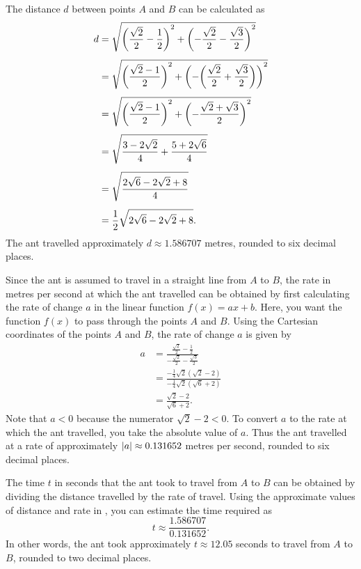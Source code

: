 \documentclass[a4paper,oneside,12pt]{article}
\begin{document}
\begin{problem}
{\begin{solution}
The distance $d$ between points $A$ and $B$ can be calculated as
\begin{align*}
d
&=
\sqrt{
  \parenthesis*{
    \frac{\sqrt{2}}{2} - \frac{1}{2}
  }^2
  +
  \parenthesis*{
    -\frac{\sqrt{2}}{2} - \frac{\sqrt{3}}{2}
  }^2
} \\[4pt]
&=
\sqrt{
  \parenthesis*{
    \frac{\sqrt{2} - 1}{2}
  }^2
  +
  \parenthesis*{
    -
    \parenthesis*{
      \frac{\sqrt{2}}{2} + \frac{\sqrt{3}}{2}
    }
  }^2
} \\[4pt]
&=
\sqrt{
  \parenthesis*{
    \frac{\sqrt{2} - 1}{2}
  }^2
  +
  \parenthesis*{
    - \frac{\sqrt{2} + \sqrt{3}}{2}
  }^2
} \\[4pt]
&=
\sqrt{
  \frac{3 - 2\sqrt{2}}{4}
  +
  \frac{5 + 2\sqrt{6}}{4}
} \\[4pt]
&=
\sqrt{
  \frac{
    2\sqrt{6} - 2\sqrt{2} + 8
  }{
    4
  }
} \\[4pt]
&=
\frac{1}{2}
\sqrt{
  2\sqrt{6} - 2\sqrt{2} + 8
}.
\end{align*}
The ant travelled approximately $d \approx 1.586707$ metres, rounded to
six decimal places.

Since the ant is assumed to travel in a straight line from $A$ to $B$,
the rate in metres per second at which the ant travelled can be
obtained by first calculating the rate of change $a$ in the linear
function $f(x) = ax + b$.  Here, you want the function $f(x)$ to pass
through the points $A$ and $B$.  Using the Cartesian coordinates of
the points $A$ and $B$, the rate of change $a$ is given by
\begin{align*}
a
&=
\frac{
  \frac{\sqrt{2}}{2} - \frac{1}{2}
}{
  -\frac{\sqrt{2}}{2} - \frac{\sqrt{3}}{2}
} \\[4pt]
&=
\frac{
  -\frac{1}{4} \sqrt{2} (\sqrt{2} - 2)
}{
  -\frac{1}{4} \sqrt{2} (\sqrt{6} + 2)
} \\[4pt]
&=
\frac{
  \sqrt{2} - 2
}{
  \sqrt{6} + 2
}.
\end{align*}
Note that $a < 0$ because the numerator $\sqrt{2} - 2 < 0$.  To
convert $a$ to the rate at which the ant travelled, you take the
absolute value of $a$.  Thus the ant travelled at a rate of
approximately $\lvert a\rvert \approx 0.131652$ metres per second,
rounded to six decimal places.

The time $t$ in seconds that the ant took to travel from $A$ to $B$
can be obtained by dividing the distance travelled by the rate of
travel.  Using the approximate values of distance and rate
in ,
you can estimate the time required as
\[
t
\approx
\frac{1.586707}{0.131652}.
\]
In other words, the ant took approximately $t \approx 12.05$ seconds
to travel from $A$ to $B$, rounded to two decimal places.
\end{solution}
}{}


\end{problem}
\end{document}
